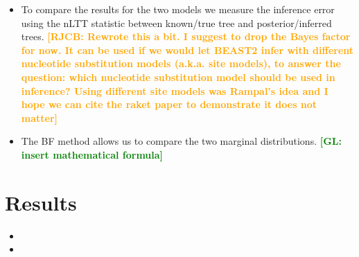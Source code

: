 \documentclass{article}
\newcommand*\richel[1]{\textcolor{orange}{\textbf{[RJCB: #1]}}}
\newcommand*\gio[1]{\textcolor{green}{\textbf{[GL: #1]}}}
\begin{document}
\begin{itemize}
\item To compare the results for the two models we measure the inference error using the nLTT statistic between known/true tree and posterior/inferred trees.
\richel{Rewrote this a bit. I suggest to drop the Bayes factor for now. It can be used if we would let BEAST2 infer with different nucleotide substitution models (a.k.a. site models), to answer the question: which nucleotide substitution model should be used in inference? Using different site models was Rampal's idea and I hope we can cite the raket paper to demonstrate it does not matter}

\item The BF method allows us to compare the two marginal distributions. \gio{insert mathematical formula}

\end{itemize}

\section{Results}
\begin{itemize}

\item

\item

\end{itemize}




\appendix


\end{document}
